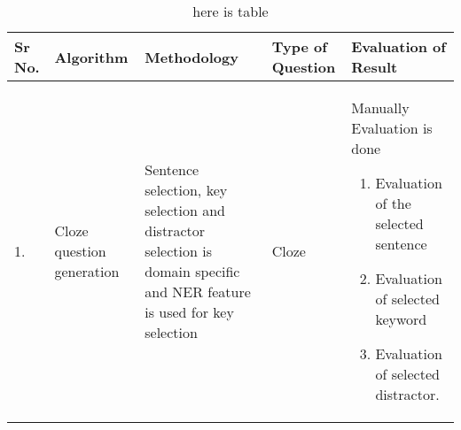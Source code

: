 \begin{center}
	\begin{longtable}{| p{0.6cm} | p{2.3cm} | p{4cm} | p{2cm} | p{5cm} |}
		\caption{here is table}\\
		\hline
		{\textbf{Sr No.}} & {\textbf{Algorithm}} & {\textbf{Methodology}} &
		{\textbf{Type of Question}} & {\textbf{Evaluation of Result}}\\[2ex]
		\hline
		1. &
		Cloze question generation &
		Sentence selection, key selection and distractor selection is
		domain specific and NER feature is used for key selection &
		Cloze &
		Manually Evaluation is done
		\begin{enumerate}
		\item Evaluation of the selected sentence
		\item Evaluation of selected keyword 
		\item Evaluation of selected distractor.
		\end{enumerate}
		\\[1ex]
		\hline


\end{longtable}
\end{center}
